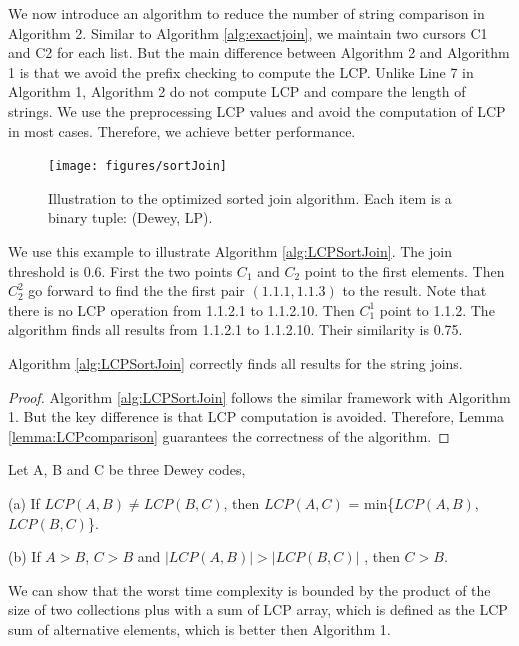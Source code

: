 We now introduce an algorithm to reduce the number of string comparison in Algorithm 2. Similar to Algorithm \ref{alg:exactjoin}, we maintain two cursors C1 and C2 for each list. But the main difference between Algorithm 2 and Algorithm 1 is that we avoid the prefix checking to compute the LCP. Unlike Line 7 in Algorithm 1, Algorithm 2 do not compute LCP and compare the length of strings. We use the preprocessing LCP values and avoid the computation of LCP in most cases. Therefore, we achieve better performance.



\begin{figure}[t]
\centering
\texttt{[image: figures/sortJoin]}
 \caption{Illustration to the optimized sorted join algorithm. Each item is a binary tuple: (Dewey, LP).}
\label{fig:sortJoin}
\end{figure}

\begin{example} We use this example to illustrate Algorithm \ref{alg:LCPSortJoin}. The join threshold is 0.6. First the two points $C_1$ and $C_2$ point to the first elements. Then $C_2^2$ go forward to find the the first pair $(1.1.1, 1.1.3)$ to the result. Note that there is no LCP operation from 1.1.2.1 to 1.1.2.10. Then $C_1^1$ point to 1.1.2. The algorithm finds all results from 1.1.2.1 to 1.1.2.10. Their similarity is 0.75.
\end{example}

\begin{theorem} Algorithm \ref{alg:LCPSortJoin} correctly finds all results for the string joins.
\end{theorem}
\begin{proof} Algorithm \ref{alg:LCPSortJoin} follows the similar framework with Algorithm 1. But the key difference is that LCP computation is avoided. Therefore, Lemma \ref{lemma:LCPcomparison} guarantees the  correctness of the algorithm.
\end{proof}

\begin{lem} Let A, B and C be three Dewey codes,

(a) If $LCP(A,B) \neq LCP(B,C)$,  then $LCP(A,C)$ = min\{$LCP(A,B)$, $LCP(B,C)$\}.

(b) If $A>B$, $C>B$ and $|LCP(A,B)|>|LCP(B,C)|$ , then $C>B$.
\label{lemma:LCPcomparison}
\end{lem}

We can show that the worst time complexity is bounded by the product of the size of two collections plus with a sum of LCP array, which is defined as the LCP sum of alternative elements, which is better then Algorithm 1.

